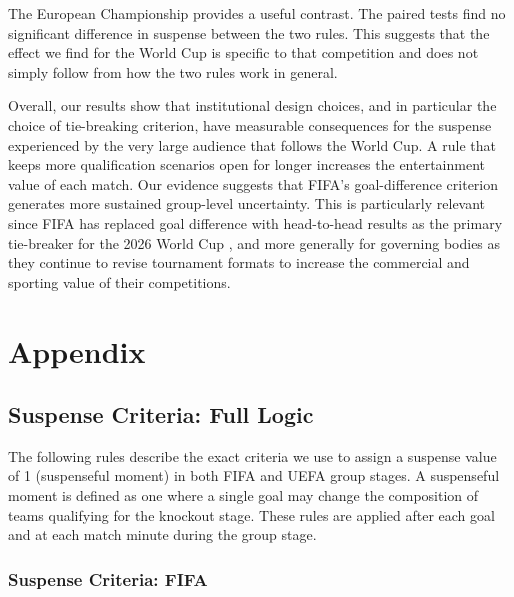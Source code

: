 \documentclass[11pt]{article}
\begin{document}
The European Championship provides a useful contrast. The paired tests find no significant difference in suspense between the two rules. This suggests that the effect we find for the World Cup is specific to that competition and does not simply follow from how the two rules work in general.

Overall, our results show that institutional design choices, and in particular the choice of tie-breaking criterion, have measurable consequences for the suspense experienced by the very large audience that follows the World Cup. A rule that keeps more qualification scenarios open for longer increases the entertainment value of each match. Our evidence suggests that FIFA's goal-difference criterion generates more sustained group-level uncertainty. This is particularly relevant since FIFA has replaced goal difference with head-to-head results as the primary tie-breaker for the 2026 World Cup \citep{csato2026match}, and more generally for governing bodies as they continue to revise tournament formats to increase the commercial and sporting value of their competitions.






\clearpage
\appendix
\section*{Appendix}
\renewcommand{\thesubsection}{A.\arabic{subsection}}
\setcounter{table}{0}
\setcounter{figure}{0}
\renewcommand{\thetable}{A\arabic{table}}
\renewcommand{\thefigure}{A\arabic{figure}}

\subsection{Suspense Criteria: Full Logic}
\label{sec:suspense-criteria}

The following rules describe the exact criteria we use to assign a suspense value of 1 (suspenseful moment) in both FIFA and UEFA group stages. A suspenseful moment is defined as one where a single goal may change the composition of teams qualifying for the knockout stage. These rules are applied after each goal and at each match minute during the group stage.

\subsubsection{Suspense Criteria: FIFA}
\label{sec:suspense-fifa-implemented}
\end{document}
